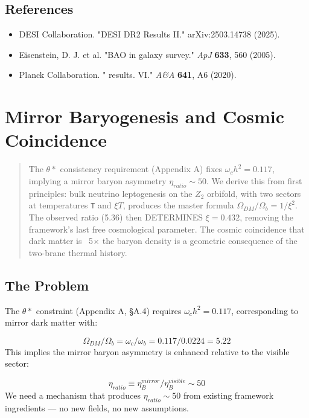 \documentclass[aps,prd,preprint,superscriptaddress,longbibliography]{revtex4-2}
\begin{document}
\subsection{References}


\begin{itemize}
  \item DESI Collaboration. "DESI DR2 Results II." arXiv:2503.14738 (2025).
  \item Eisenstein, D. J. et al. "BAO in galaxy survey." \textit{ApJ} \textbf{633}, 560 (2005).
  \item Planck Collaboration. "\cite{Planck2018_VI} results. VI." \textit{A\&A} \textbf{641}, A6 (2020).
\end{itemize}


\section{Mirror Baryogenesis and Cosmic Coincidence}


\begin{quote}
The $\theta*$ consistency requirement (Appendix A) fixes $\omega_c h^{2} = 0.117$,
implying a mirror baryon asymmetry $\eta_{ratio} \sim  50$. We derive this
from first principles: bulk neutrino leptogenesis on the $Z_{2}$ orbifold,
with two sectors at temperatures \texttt{T} and $\xi T$, produces the master formula
$\Omega_{DM}/\Omega_b = 1/\xi^{2}$. The observed ratio (5.36) then DETERMINES $\xi = 0.432$,
removing the framework's last free cosmological parameter. The cosmic
coincidence that dark matter is ~5$\times$ the baryon density is a geometric
consequence of the two-brane thermal history.
\end{quote}



\subsection{The Problem}

The $\theta*$ constraint (Appendix A, \S{}A.4) requires $\omega_c h^{2} = 0.117$, corresponding to mirror dark matter with:


\begin{equation}
    \Omega_{DM} / \Omega_b = \omega_c / \omega_b = 0.117 / 0.0224 = 5.22
\end{equation}
This implies the mirror baryon asymmetry is enhanced relative to the visible sector:


\begin{equation}
    \eta_{ratio} \equiv \eta_B^{mirror} / \eta_B^{visible} \sim  50
\end{equation}
We need a mechanism that produces $\eta_{ratio} \sim  50$ from existing framework ingredients --- no new fields, no new assumptions.
\end{document}
